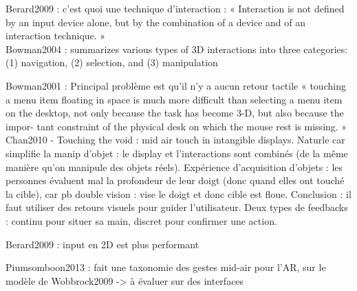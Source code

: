 

Berard2009 : c'est quoi une technique d'interaction : « Interaction is not defined by an input device alone, but by the combination of a device and of an interaction technique. »\\
Bowman2004 : summarizes various types of 3D interactions into three categories: (1) navigation, (2) selection, and (3)
manipulation

Bowman2001 : Principal problème est qu'il n'y a aucun retour tactile « touching a menu item floating in space is much more difficult than selecting a menu item on the desktop, not only because the task has become 3-D, but also because the impor- tant constraint of the physical desk on which the mouse rest is missing. »\\
Chan2010 - Touching the void : mid air touch in intangible displays. Naturle car simplifie la manip d'objet : le display et l'interactions sont combinés (de la même manière qu'on manipule des objets réels). Expérience d'acquisition d'objets : les personnes évaluent mal la profondeur de leur doigt (donc quand elles ont touché la cible), car pb double vision : vise le doigt et donc cible est floue. Conclusion : il faut utiliser des retours visuels pour guider l'utilisateur. Deux types de feedbacks : continu pour situer sa main, discret pour confirmer une action.

Berard2009 : input en 2D est plus performant

Piumsomboon2013 : fait une taxonomie des gestes mid-air pour l'AR, sur le modèle de Wobbrock2009 -> à évaluer sur des interfaces

